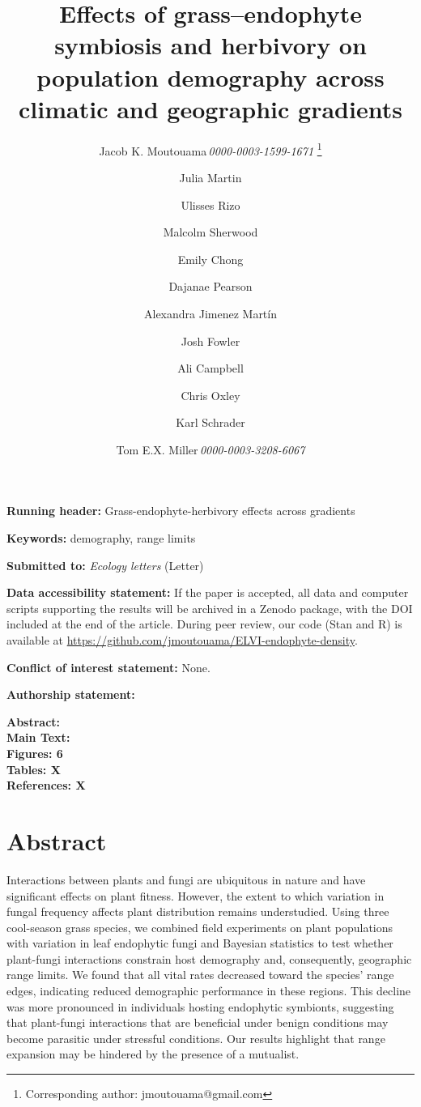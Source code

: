 \documentclass[12pt]{article}\usepackage[]{graphicx}\usepackage[dvipsnames]{xcolor}
\title{Effects of grass–endophyte symbiosis and herbivory on population demography across climatic and geographic gradients}
\author[1]{Jacob K. Moutouama\,\textit{0000-0003-1599-1671} \thanks{Corresponding author: jmoutouama@gmail.com}}
\author[1]{Julia Martin}
\author[1]{Ulisses Rizo}
\author[1]{Malcolm Sherwood}
\author[1]{Emily Chong}
\author[1]{Dajanae Pearson}
\author[1]{Alexandra Jimenez Martín}
\author[2]{Josh Fowler}
\author[1]{Ali Campbell}
\author[1]{Chris Oxley}
\author[1]{Karl Schrader}
\author[1]{Tom E.X. Miller\,\textit{0000-0003-3208-6067}}
\affil[1]{Program in Ecology and Evolutionary Biology, Department of BioSciences, Rice University, Houston, TX USA}
\affil[2]{University of Miami, Department of Biology, Miami, FL USA}
\date{} %
\begin{document}
\renewcommand{\baselinestretch}{1.2}
\maketitle
\noindent\textbf{Running header:} Grass-endophyte-herbivory effects across gradients
\bigskip 

\noindent\textbf{Keywords:} demography, range limits

\bigskip 
\noindent\textbf{Submitted to:} \textit{Ecology letters} (Letter)

\bigskip 
\noindent\textbf{Data accessibility statement:} 
If the paper is accepted, all data and computer scripts supporting the results will be archived in a Zenodo package, with the DOI included at the end of the article. 
During peer review, our code (Stan and R) is available at \url{https://github.com/jmoutouama/ELVI-endophyte-density}. 

\bigskip 
\noindent\textbf{Conflict of interest statement:} None.

\bigskip
\noindent\textbf{Authorship statement:}

\bigskip
\noindent\textbf{Abstract:}\\
\noindent\textbf{Main Text:}\\
\noindent\textbf{Figures: 6}\\
\noindent\textbf{Tables: X}\\
\noindent\textbf{References: X}

\newpage
\linenumbers
\section*{Abstract}
Interactions between plants and fungi are ubiquitous in nature and have significant effects on plant fitness.
However, the extent to which variation in fungal frequency affects plant distribution remains understudied. 
Using three cool-season grass species, we combined field experiments on plant populations with variation in leaf endophytic fungi and Bayesian statistics to test whether plant-fungi interactions constrain host demography and, consequently, geographic range limits. 
We found that all vital rates decreased toward the species' range edges, indicating reduced demographic performance in these regions. 
This decline was more pronounced in individuals hosting endophytic symbionts, suggesting that plant-fungi interactions that are beneficial under benign conditions may become parasitic under stressful conditions.
Our results highlight that range expansion may be hindered by the presence of a mutualist.
\end{document}
